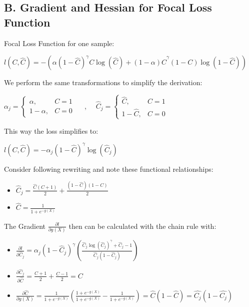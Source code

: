 \documentclass[12pt,titlepage]{article}
\begin{document}
\subsection*{B. Gradient and Hessian for Focal Loss Function} \par
\vspace*{6mm}
\noindent
Focal Loss Function for one sample:
\begin{center}
$l(C, \hat{C}) = -\left(\alpha (1-\hat{C})^{\gamma} C\log(\hat{C}) + (1-\alpha)\hat{C}^{\gamma}(1 - C)\log(1 - \hat{C})\right)$
\end{center}
\noindent
We perform the same transformations to simplify the derivation:
\begin{center}
    $\alpha_j = \begin{cases} \alpha,& C = 1 \\ 1 - \alpha,& C = 0 \end{cases}$\,\,\,\,\,\, ,\,\,\,\,\,\, $\hat{C}_j = \begin{cases} \hat{C},& C = 1 \\ 1 - \hat{C},& C = 0 \end{cases}$
\end{center}
\noindent
This way the loss simplifies to:
\begin{center}
    $l(C, \hat{C}) = -\alpha_j (1-\hat{C})^{\gamma}\log(\hat{C}_j)$
\end{center}
\noindent
Consider following rewriting and note these functional relationships:
\begin{itemize}
    \item $\hat{C}_j = \frac{\hat{C}(C+1)}{2} + \frac{(1-\hat{C})(1-C)}{2}$
    \item $\hat{C} = \frac{1}{1+e^{-g(X)}}$
\end{itemize}
\noindent
The Gradient $\frac{\partial l}{\partial g(X)}$ then can be calculated with the chain rule with:
\begin{itemize}
    \item $\frac{\partial l}{\partial \hat{C}_j} = \alpha_j(1-\hat{C}_j)^{\gamma} \left(\frac{\hat{C}_j\log(\hat{C}_j)^\gamma + \hat{C}_j - 1}{\hat{C}_j(1-\hat{C}_j)}\right)$
    \item $\frac{\partial \hat{C}_j}{\partial \hat{C}} = \frac{C+1}{2} + \frac{C-1}{2} = C$
    \item $\frac{\partial \hat{C}}{\partial g(X)} = \frac{1}{1+e^{-g(X)}}(\frac{1+e^{-g(X)}}{1+e^{-g(X)}} - \frac{1}{1+e^{-g(X)}}) = \hat{C}(1-\hat{C}) = \hat{C_j}(1-\hat{C_j})$
\end{itemize}
\end{document}
